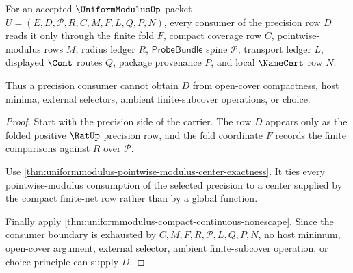 \begin{theorem}
\label{thm:uniformmodulus-precision-consumer-nonescape}
For an accepted $\UniformModulusUp$ packet $U=(E,D,\mathcal{P},R,C,M,F,L,Q,P,N)$, every consumer of the precision row $D$ reads it only through the finite fold $F$, compact coverage row $C$, pointwise-modulus rows $M$, radius ledger $R$, $\mathsf{ProbeBundle}$ spine $\mathcal{P}$, transport ledger $L$, displayed $\Cont$ routes $Q$, package provenance $P$, and local $\NameCert$ row $N$.

Thus a precision consumer cannot obtain $D$ from open-cover compactness, host minima, external selectors, ambient finite-subcover operations, or choice.
\end{theorem}
\begin{proof}
Start with the precision side of the carrier. The row $D$ appears only as the folded positive $\RatUp$ precision row, and the fold coordinate $F$ records the finite comparisons against $R$ over $\mathcal{P}$.

Use \autoref{thm:uniformmodulus-pointwise-modulus-center-exactness}. It ties every pointwise-modulus consumption of the selected precision to a center supplied by the compact finite-net row rather than by a global function.

Finally apply \autoref{thm:uniformmodulus-compact-continuous-nonescape}. Since the consumer boundary is exhausted by $C,M,F,R,\mathcal{P},L,Q,P,N$, no host minimum, open-cover argument, external selector, ambient finite-subcover operation, or choice principle can supply $D$.
\end{proof}

